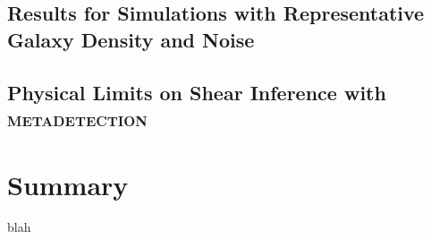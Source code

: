 \documentclass[fleqn,useAMS,usenatbib]{mnras}
\newcommand{\mdet}{\textsc{metadetection}}
\begin{document}
\subsection{Results for Simulations with Representative Galaxy Density and Noise}
\label{sec:res:constpsf}


\subsection{Physical Limits on Shear Inference with \mdet}
\label{sec:res:physlim}


\section{Summary}
blah



\end{document}
